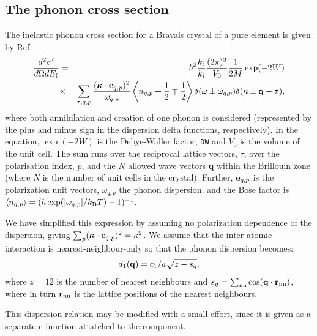 \subsection{The phonon cross section} %
The inelastic phonon cross section for a Bravais crystal of a pure element
is given by Ref.~\cite[ch.3~]{squires}
\begin{eqnarray}
\frac{d^2\sigma'}{d\Omega dE_{\rm f}} &=&
  b^2 \frac{k_{\rm f}}{k_{\rm i}} \frac{(2\pi)^3}{V_0}\frac{1}{2M} \exp(-2W) \nonumber \\
&\times&
  \sum_{\tau,q,p} \frac{(\mbox{\boldmath $\kappa$} \cdot {\bf e}_{q,p})^2}
                       {\omega_{q,p}}
  \left\langle n_{q,p} + \frac{1}{2} \mp \frac{1}{2} \right\rangle
  \delta(\omega\pm\omega_{q,p}) \delta(\kappa\pm{\bf q}-\tau) ,
\end{eqnarray}
where both annihilation and creation of one phonon is considered
(represented by the plus and minus sign in the dispersion delta functions,
respectively).
In the equation,
$\exp(-2W)$ is the Debye-Waller factor, \verb+DW+ and
$V_0 $ is the volume of the unit cell.
The sum runs over the reciprocal lattice vectors, $\tau$,
over the polarisation index, $p$,
and the $N$ allowed wave vectors {\bf q} within the Brillouin zone
(where $N$ is the number of unit cells in the crystal).
Further, ${\bf e}_{q,p}$ is the
polarization unit vectors, $\omega_{q,p}$ the phonon dispersion,
and the Bose factor is
$\langle n_{q,p} \rangle = (\hbar \exp(|\omega_{q,p}|/k_{\rm B}T)-1)^{-1}$.

We have simplified this expression by assuming no polarization
dependence of the dispersion, giving
$\sum_{p} (\mbox{\boldmath $\kappa$} \cdot {\bf e}_{q,p})^2 = \kappa^2$.
We assume that the inter-atomic interaction is nearest-neighbour-only
so that the phonon dispersion becomes:
\begin{equation}
d_1({\bf q}) = c_1/a \sqrt{z-s_q} ,
\end{equation}
where $z=12$ is the number of nearest neighbours and
$s_q=\sum_{\rm nn} \cos({\bf q} \cdot {\bf r}_{\rm nn})$,
where in turn ${\bf r}_{\rm nn}$ is the lattice positions of the
nearest neighbours.

This dispersion relation may be modified with a small effort,
since it is given as a separate c-function attatched to the component.


